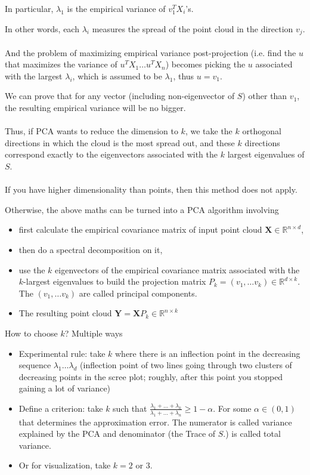 \documentclass{article}
\begin{document}
In particular, $\lambda_1$ is the empirical variance of $v_1^T X_i$'s.

In other words, each $\lambda_i$ measures the spread of the point cloud in the direction $v_j$.
\\
\\
And the problem of maximizing empirical variance post-projection (i.e. find the $u$ that maximizes the variance of $u^T X_1 \dots u^T X_n$) becomes
picking the $u$ associated with the largest $\lambda_i$,
which is assumed to be $\lambda_1$,
thus $u = v_1$.

We can prove that for any vector (including non-eigenvector of $S$) other than $v_1$,
the resulting empirical variance will be no bigger.
\\
\\
Thus, if PCA wants to reduce the dimension to $k$,
we take the $k$ orthogonal directions in which the cloud is the most spread out,
and these $k$ directions correspond exactly to the eigenvectors associated with the $k$ largest eigenvalues of $S$.
\\
\\
If you have higher dimensionality than points, then this method does not apply.

Otherwise, the above maths can be turned into a PCA algorithm involving
\begin{itemize}
  \item first calculate the empirical covariance matrix of input point cloud $\mathbf{X} \in \mathbb{R}^{n \times d}$,
  \item then do a spectral decomposition on it,
  \item use the $k$ eigenvectors of the empirical covariance matrix
  associated with the $k$-largest eigenvalues to build the projection matrix
  $P_k = (v_1, \dots v_k) \in \mathbb{R}^{d \times k}$.
  The $(v_1, \dots v_k)$ are called principal components.
  \item The resulting point cloud $\mathbf{Y} = \mathbf{X} P_k \in \mathbb{R}^{n \times k}$
\end{itemize}

How to choose $k$?
Multiple ways
\begin{itemize}
  \item Experimental rule: take $k$ where there is an inflection point in the decreasing sequence $\lambda_1 \dots \lambda_d$
  (inflection point of two lines going through two clusters of decreasing points in the scree plot;
   roughly, after this point you stopped gaining a lot of variance)
  \item Define a criterion: take $k$ such that $\frac{\lambda_1 + \dots + \lambda_k}{\lambda_1 + \dots + \lambda_n} \geq 1 - \alpha$.
  For some $\alpha \in (0, 1)$ that determines the approximation error.
  The numerator is called variance explained by the PCA and denominator (the Trace of $S$.) is called total variance.
  \item Or for visualization, take $k = 2$ or $3$.
\end{itemize}
\end{document}
